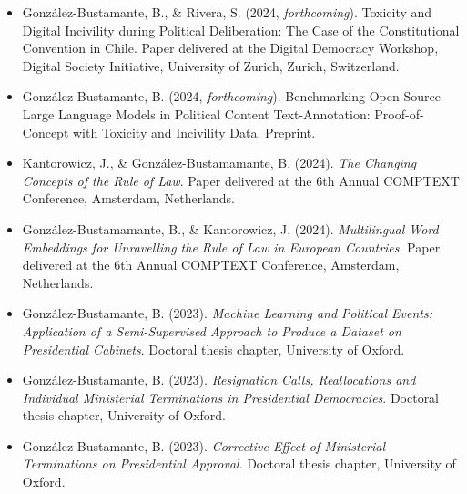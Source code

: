 \begin{publications}

\begin{itemize}

\item{González-Bustamante, B., \& Rivera, S. (2024, {\itshape forthcoming}). Toxicity and Digital Incivility during Political Deliberation: The Case of the Constitutional Convention in Chile. Paper delivered at the Digital Democracy Workshop, Digital Society Initiative, University of Zurich, Zurich, Switzerland.}\vspace{1mm}

\item{González-Bustamante, B. (2024, {\itshape forthcoming}). Benchmarking Open-Source Large Language Models in Political Content Text-Annotation: Proof-of-Concept with Toxicity and Incivility Data. Preprint.}\vspace{1mm}

\item{Kantorowicz, J., \& González-Bustamamante, B. (2024). {\itshape The Changing Concepts of the Rule of Law}. Paper delivered at the 6th Annual COMPTEXT Conference, Amsterdam, Netherlands.}\vspace{1mm}

\item{González-Bustamamante, B., \& Kantorowicz, J. (2024). {\itshape Multilingual Word Embeddings for Unravelling the Rule of Law in European Countries}. Paper delivered at the 6th Annual COMPTEXT Conference, Amsterdam, Netherlands.}\vspace{1mm}

\item{González-Bustamante, B. (2023). {\itshape Machine Learning and Political Events: Application of a Semi-Supervised Approach to Produce a Dataset on Presidential Cabinets}. Doctoral thesis chapter, University of Oxford.}\vspace{1mm}

\item{González-Bustamante, B. (2023). {\itshape Resignation Calls, Reallocations and Individual Ministerial Terminations in Presidential Democracies}. Doctoral thesis chapter, University of Oxford.}\vspace{1mm}

\item{González-Bustamante, B. (2023). {\itshape Corrective Effect of Ministerial Terminations on Presidential Approval}. Doctoral thesis chapter, University of Oxford.}\vspace{1mm}

\end{itemize}

\end{publications}

